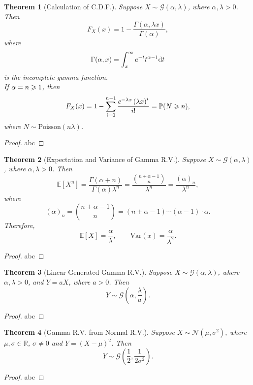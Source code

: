 \documentclass[openany,12pt]{book}
\newtheorem{theorem}{Theorem}[chapter]
\begin{document}
\begin{theorem}[Calculation of C.D.F.]
  Suppose $X\sim\mathcal{G}(\alpha,\lambda)$, where $\alpha,\lambda>0$. Then
  $$
    F_X(x)=1-\frac{{\Gamma}(\alpha,\lambda x)}{{\Gamma}(\alpha)},
  $$
  where
  $$
    {\Gamma}(\alpha,x)=\int_{x}^{\infty}{e^{-t}t^{\alpha-1}\mathrm{d} t}
  $$
  is the incomplete gamma function.\\
  If $\alpha=n\geqslant1$, then
  $$
    F_X(x)=1-\sum_{i=0}^{n-1}\frac{e^{-\lambda x}\left(\lambda x\right)^i}{i!}=\mathbb{P}(N\geqslant n),
  $$
  where $N\sim\mathrm{Poisson}(n\lambda)$.
\end{theorem}

\begin{proof}
  abc
\end{proof}

\begin{theorem}[Expectation and Variance of Gamma R.V.]
  Suppose $X\sim\mathcal{G}(\alpha,\lambda)$, where $\alpha,\lambda>0$. Then
  $$
    \mathbb{E}\left[X^n\right]=\frac{{\Gamma}(\alpha+n)}{{\Gamma}(\alpha)\lambda^n}=\frac{\binom{n+\alpha-1}{n}}{\lambda^n}=\frac{{(\alpha)}_n}{\lambda^n},
  $$
  where
  $$
    {(\alpha)}_n=\binom{n+\alpha-1}{n}=\left(n+\alpha-1\right)\cdots\left(\alpha-1\right)\cdot\alpha.
  $$
  Therefore,
  \[\mathbb{E}[ X] = \frac{\alpha}{\lambda},\qquad\mathrm{Var}(x)= \frac{\alpha}{\lambda^{2}}.
  \]
\end{theorem}

\begin{proof}
  abc
\end{proof}

\begin{theorem}[Linear Generated Gamma R.V.]
  Suppose $X\sim\mathcal{G}(\alpha,\lambda)$, where $\alpha,\lambda>0$, and $Y=aX$, where $a>0$. Then
  \[Y\sim\mathcal{G}\left( \alpha,\frac{\lambda}{a} \right).\]
\end{theorem}

\begin{proof}
  abc
\end{proof}

\begin{theorem}[Gamma R.V. from Normal R.V.]
  Suppose $X\sim \mathcal{N}(\mu,\sigma^2)$, where $\mu,\sigma\in\mathbb{R}$, $\sigma\neq0$ and $Y={(X-\mu)}^2$. Then
  \[Y\sim\mathcal{G}\left( \frac{1}{2},\frac{1}{2\sigma^{2}} \right).\]
\end{theorem}

\begin{proof}
  abc
\end{proof}
\end{document}
